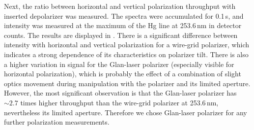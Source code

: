 Next, the ratio between horizontal and vertical polarization throughput with
inserted depolarizer was measured.
The spectra were accumulated for 0.1\,s,
and intensity was measured at the maximum of the Hg line at 253.6\,nm in
detector counts.
The results are displayed in
.
There is a significant difference between intensity with horizontal and vertical
polarization for a wire-grid polarizer, which indicates a strong dependence of
its characteristics on polarizer tilt.
There is also a higher variation in signal for the Glan-laser polarizer
(especially visible for horizontal polarization), which is probably the effect
of a combination of slight optics movement during manipulation with the
polarizer and its limited aperture.
However, the most significant observation is that the Glan-laser polarizer has
$\sim 2.7$ times higher throughput than the wire-grid polarizer at 253.6\,nm,
nevertheless its limited aperture.
Therefore we chose Glan-laser polarizer for any further polarization
measurements.

\begin{table}
	\centering
	
	\caption[%
		Performace comparison of wire-grid and Glan-laser polarizer.%
	]{%
		$I$ stands for intensity of 253.6\,nm Hg line at maximum detector counts,
		and subscripts v and h stand for vertical and horizontal polarizer
		orientation.
	}
	\label{\tablabel{polarized_measurements:polarizer_evaluation}}
\end{table}
